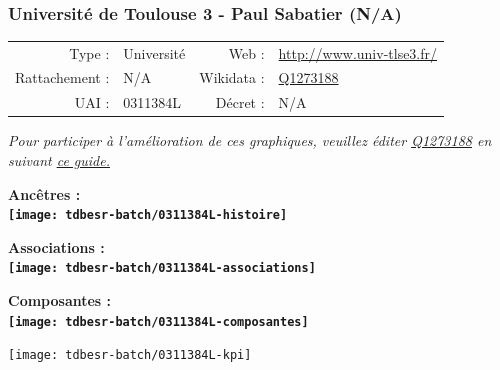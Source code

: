 \documentclass[12pt,french,]{article}
\begin{document}
\ifoddpage \fi ~\newpage  

\hypertarget{universituxe9-de-toulouse-3---paul-sabatier-na}{%
\subsubsection{Université de Toulouse 3 - Paul Sabatier
(N/A)}\label{universituxe9-de-toulouse-3---paul-sabatier-na}}

\begin{tabular*}{\textwidth}{rp{5cm}rl}  
\hline  
Type : & Université & Web : &\href{http://www.univ-tlse3.fr/}{http://www.univ-tlse3.fr/} \\  
Rattachement : & N/A & Wikidata : & \href{https://www.wikidata.org/entity/Q1273188}{Q1273188} \\  
UAI : & 0311384L & Décret : & N/A \\  
\hline  
\end{tabular*}

\textit{\scriptsize Pour participer à l'amélioration de ces graphiques, veuillez éditer  \href{https://www.wikidata.org/entity/Q1273188}{Q1273188}  en suivant \href{https://github.com/cpesr/wikidataESR/blob/master/Rmd/wikidataESR.md}{ce guide.}}

\vspace{1cm}  
\begin{minipage}[b]{0.50\textwidth}\begin{center} \bf Ancêtres : \\  
\texttt{[image: tdbesr-batch/0311384L-histoire]} \end{center}\end{minipage}\begin{minipage}[b]{0.50\textwidth}\begin{center} \bf Associations : \\  
\texttt{[image: tdbesr-batch/0311384L-associations]} \end{center}\end{minipage}

\hrulefill

\begin{center} \bf Composantes : \\  
\texttt{[image: tdbesr-batch/0311384L-composantes]} \end{center}

\begin{center}\texttt{[image: tdbesr-batch/0311384L-kpi]} \end{center}\checkoddpage
\end{document}

